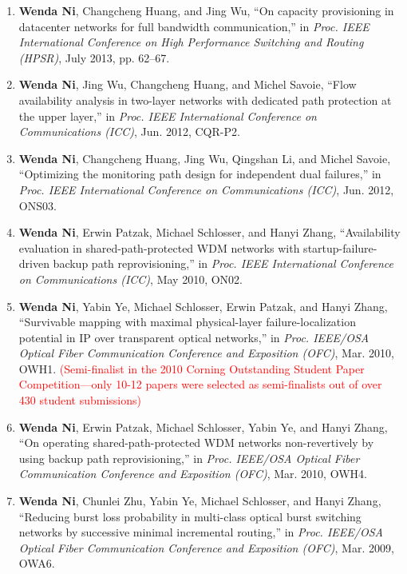 \documentclass[letterpaper,11pt]{article}
\begin{document}
\begin{enumerate}
\item
\textbf{Wenda Ni}, Changcheng Huang, and Jing Wu, ``On capacity provisioning in datacenter networks for full bandwidth communication,'' in \textit{Proc. IEEE International Conference on High Performance Switching and Routing (HPSR)}, July 2013, pp. 62--67.

\item
\textbf{Wenda Ni}, Jing Wu, Changcheng Huang, and Michel Savoie, ``Flow availability analysis in two-layer networks with dedicated path protection at the upper layer,'' in \textit{Proc. IEEE International Conference on Communications (ICC)}, Jun. 2012, CQR-P2.

\item
\textbf{Wenda Ni}, Changcheng Huang, Jing Wu, Qingshan Li, and Michel Savoie, ``Optimizing the monitoring path design for independent dual failures,'' in \textit{Proc. IEEE International Conference on Communications (ICC)}, Jun. 2012, ONS03.

\item
\textbf{Wenda Ni}, Erwin Patzak, Michael Schlosser, and Hanyi Zhang, ``Availability evaluation in shared-path-protected WDM networks with startup-failure-driven backup path reprovisioning,'' in \textit{Proc. IEEE International Conference on Communications (ICC)}, May 2010, ON02.

\item
\textbf{Wenda Ni}, Yabin Ye, Michael Schlosser, Erwin Patzak, and Hanyi Zhang, ``Survivable mapping with maximal physical-layer failure-localization potential in IP over transparent optical networks,'' in \textit{Proc. IEEE/OSA Optical Fiber Communication Conference and Exposition (OFC)}, Mar. 2010, OWH1. \textcolor{Red}{(Semi-finalist in the 2010 Corning Outstanding Student Paper Competition---only 10-12 papers were selected as semi-finalists out of over 430 student submissions)}

\item
\textbf{Wenda Ni}, Erwin Patzak, Michael Schlosser, Yabin Ye, and Hanyi Zhang, ``On operating shared-path-protected WDM networks non-revertively by using backup path reprovisioning,'' in \textit{Proc. IEEE/OSA Optical Fiber Communication Conference and Exposition (OFC)}, Mar. 2010, OWH4.

\item
\textbf{Wenda Ni}, Chunlei Zhu, Yabin Ye, Michael Schlosser, and Hanyi Zhang, ``Reducing burst loss probability in multi-class optical burst switching networks by successive minimal incremental routing,'' in \textit{Proc. IEEE/OSA Optical Fiber Communication Conference and Exposition (OFC)}, Mar. 2009, OWA6.


\end{enumerate}
\end{document}
